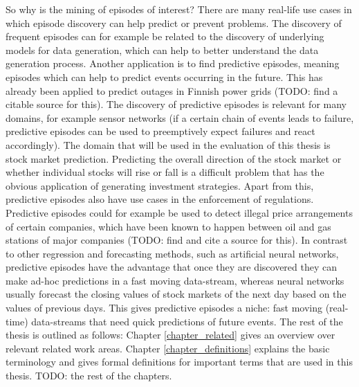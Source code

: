 So why is the mining of episodes of interest? There are many real-life use cases in which episode discovery can help predict or prevent problems. The discovery of frequent episodes can for example be related to the discovery of underlying models for data generation, which can help to better understand the data generation process. Another application is to find predictive episodes, meaning episodes which can help to predict events occurring in the future. This has already been applied to predict outages in Finnish power grids (TODO: find a citable source for this). The discovery of predictive episodes is relevant for many domains, for example sensor networks (if a certain chain of events leads to failure, predictive episodes can be used to preemptively expect failures and react accordingly). The domain that will be used in the evaluation of this thesis is stock market prediction. Predicting the overall direction of the stock market or whether individual stocks will rise or fall is a difficult problem that has the obvious application of generating investment strategies. Apart from this, predictive episodes also have use cases in the enforcement of regulations. Predictive episodes could for example be used to detect illegal price arrangements of certain companies, which have been known to happen between oil and gas stations of major companies (TODO: find and cite a source for this). \newline
In contrast to other regression and forecasting methods, such as artificial neural networks, predictive episodes have the advantage that once they are discovered they can make ad-hoc predictions in a fast moving data-stream, whereas neural networks usually forecast the closing values of stock markets of the next day based on the values of previous days. This gives predictive episodes a niche: fast moving (real-time) data-streams that need quick predictions of future events. \newline
The rest of the thesis is outlined as follows: Chapter \ref{chapter_related} gives an overview over relevant related work areas. Chapter \ref{chapter_definitions} explains the basic terminology and gives formal definitions for important terms that are used in this thesis. TODO: the rest of the chapters.
 

